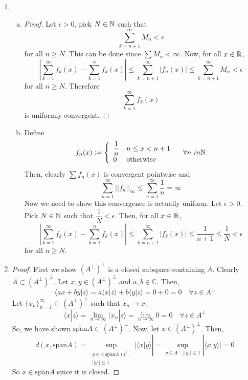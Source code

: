 \begin{enumerate}


\item 
	\begin{enumerate}[(a)]
	\item \begin{proof}
	Let $\epsilon >0$, pick $N \in \mathbb{N}$ such that
		\[ \sum_{k=n+1}^\infty M_n < \epsilon \]
	for all $n \ge N$. This can be done since $\sum M_n < \infty$. Now, for all $x \in \mathbb{R}$,
		\[ \left| \sum_{k=1}^\infty f_k(x) - \sum_{k=1}^n f_k(x) \right| \le \sum_{k=n+1}^\infty |f_n(x)| \le \sum_{k=n+1}^\infty M_n < \epsilon \]
	for all $n \ge N$. Therefore
		\[ \sum_{k=1}^\infty f_k(x) \]
	is uniformly convergent.
	\end{proof}

	\item Define
		\[ f_n(x) := \left\{ \begin{array}{ll} \dfrac 1n & n \le x < n+1 \\ 0 & \text{otherwise} \end{array} \right. \quad \forall n\ in \mathbb{N} \]
		Then, clearly $\sum f_n(x)$ is convergent pointwise and
			\[ \sum_{n=1}^\infty ||f_n||_\infty \le \sum_{n=1}^\infty \dfrac 1n = \infty \]
		Now we need to show this convergence is actually uniform. Let $\epsilon >0$. Pick $N \in \mathbb{N}$ such that $\dfrac 1N < \epsilon$. Then, for all $x \in \mathbb{R}$,
			\[ \left| \sum_{k=1}^\infty f_k(x) - \sum_{k=1}^n f_k(x) \right| \le \sum_{k=n+1}^\infty |f_k(x)| \le \dfrac 1{n+1} \le \dfrac 1N < \epsilon \]
		for all $n \ge N$.
	\end{enumerate}

\item \begin{proof}
First we show $(A^{\perp})^{\perp}$ is a closed subspace containing $A$. Clearly $ A \subset (A^{\perp})^{\perp}$. Let $x,y \in (A^{\perp})^{\perp}$ and $a,b \in \mathbb{C}$. Then,
	\[ \langle ax+by | z \rangle = a\langle x| z \rangle + b\langle y | z \rangle = 0 + 0 = 0 \quad \forall z \in A^{\perp} \]
Let $\{x_n\}_{n=1}^{\infty} \subset (A^{\perp})^{\perp}$ such that $x_n \to x$.
	\[ \langle x | z \rangle = \lim_{n\to \infty} \langle x_n | z \rangle = \lim_{n \to \infty} 0 = 0 \quad \forall z \in A^{\perp} \]
So, we have shown  $\overline{\text{span}}A \subset (A^{\perp})^{\perp}$. Now, let $x \in (A^{\perp})^{\perp}$. Then,
	\[ d(x,\overline{\text{span}}A) = \sup_{\substack{y \in (\overline{\text{span}}A))^{\perp},\\ ||y|| \le 1} } |\langle x | y \rangle | = \sup_{y \in A^{\perp}, ||y|| \le 1 } |\langle x | y \rangle | = 0\]
So $x \in \overline{\text{span}}A$ since it is closed.
\end{proof}


\end{enumerate}
